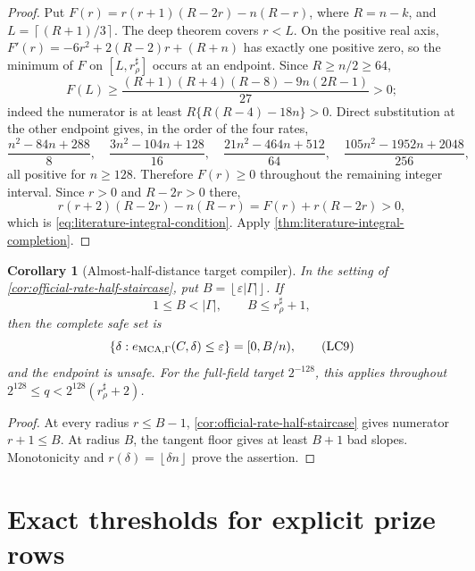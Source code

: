 \documentclass[11pt,a4paper]{amsart}
\numberwithin{equation}{section}
\newtheorem{corollary}[corollary]{Corollary}
\theoremstyle{remark}
\newcommand{\eps}{\varepsilon}
\newcommand{\abs}[1]{\lvert #1\rvert}
\newcommand{\floor}[1]{\left\lfloor #1\right\rfloor}
\newcommand{\ceil}[1]{\left\lceil #1\right\rceil}
\begin{document}
\begin{proof}
Put \(F(r)=r(r+1)(R-2r)-n(R-r)\), where \(R=n-k\), and
\(L=\ceil{(R+1)/3}\).  The deep theorem covers \(r<L\).  On the
positive real axis, \(F'(r)=-6r^2+2(R-2)r+(R+n)\) has exactly one
positive zero, so the minimum of \(F\) on \([L,r_\rho^\sharp]\) occurs
at an endpoint.  Since \(R\ge n/2\ge64\),
\[
 F(L)\ge
 \frac{(R+1)(R+4)(R-8)-9n(2R-1)}{27}>0;
\]
indeed the numerator is at least
\(R\{R(R-4)-18n\}>0\).  Direct substitution at the other endpoint gives,
in the order of the four rates,
\[
 \frac{n^2-84n+288}{8},\quad
 \frac{3n^2-104n+128}{16},\quad
 \frac{21n^2-464n+512}{64},\quad
 \frac{105n^2-1952n+2048}{256},
\]
all positive for \(n\ge128\).  Therefore \(F(r)\ge0\) throughout the
remaining integer interval.  Since \(r>0\) and \(R-2r>0\) there,
\[
 r(r+2)(R-2r)-n(R-r)=F(r)+r(R-2r)>0,
\]
which is \eqref{eq:literature-integral-condition}.  Apply
\cref{thm:literature-integral-completion}.
\end{proof}

\begin{corollary}[Almost-half-distance target compiler]
\label{cor:half-distance-window-compiler}
In the setting of \cref{cor:official-rate-half-staircase}, put
\(B=\floor{\eps\abs\Gamma}\).  If
\[
 1\le B<\abs\Gamma,\qquad B\le r_\rho^\sharp+1,
\]
then the complete safe set is
\[
 \{\delta:e_{\rm MCA,\Gamma}(C,\delta)\le\eps\}
       =[0,B/n),                                   \tag{LC9}
 \label{eq:half-distance-safe-set}
\]
and the endpoint is unsafe.  For the full-field target \(2^{-128}\),
this applies throughout
\(2^{128}\le q<2^{128}(r_\rho^\sharp+2)\).
\end{corollary}

\begin{proof}
At every radius \(r\le B-1\),
\cref{cor:official-rate-half-staircase} gives numerator
\(r+1\le B\).  At radius \(B\), the tangent floor gives at least
\(B+1\) bad slopes.  Monotonicity and
\(r(\delta)=\floor{\delta n}\) prove the assertion.
\end{proof}


\section{Exact thresholds for explicit prize rows}\label{sec:prize-rows}
\end{document}
